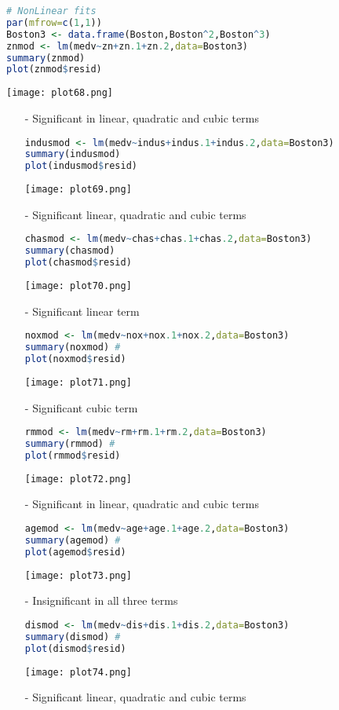 \documentclass[11pt]{report}
\begin{document}
\begin{lstlisting}[language=R]
# NonLinear fits
par(mfrow=c(1,1))
Boston3 <- data.frame(Boston,Boston^2,Boston^3)
znmod <- lm(medv~zn+zn.1+zn.2,data=Boston3)
summary(znmod)  
plot(znmod$resid)   
\end{lstlisting}
\texttt{[image: plot68.png]}
\begin{itemize}
\item[-] Significant in linear, quadratic and cubic terms

\begin{lstlisting}[language=R]
indusmod <- lm(medv~indus+indus.1+indus.2,data=Boston3)
summary(indusmod) 
plot(indusmod$resid)
\end{lstlisting}
\texttt{[image: plot69.png]}
\item[-] Significant linear, quadratic and cubic terms

\begin{lstlisting}[language=R]
chasmod <- lm(medv~chas+chas.1+chas.2,data=Boston3)
summary(chasmod) 
plot(chasmod$resid) 
\end{lstlisting}
\texttt{[image: plot70.png]}
\item[-] Significant linear term

\begin{lstlisting}[language=R]
noxmod <- lm(medv~nox+nox.1+nox.2,data=Boston3)
summary(noxmod) # 
plot(noxmod$resid)
\end{lstlisting}
\texttt{[image: plot71.png]}
\item[-] Significant cubic term

\begin{lstlisting}[language=R]
rmmod <- lm(medv~rm+rm.1+rm.2,data=Boston3)
summary(rmmod) # 
plot(rmmod$resid)
\end{lstlisting}
\texttt{[image: plot72.png]}
\item[-] Significant in linear, quadratic and cubic terms

\begin{lstlisting}[language=R]
agemod <- lm(medv~age+age.1+age.2,data=Boston3)
summary(agemod) # 
plot(agemod$resid)
\end{lstlisting}
\texttt{[image: plot73.png]}
\item[-] Insignificant in all three terms

\begin{lstlisting}[language=R]
dismod <- lm(medv~dis+dis.1+dis.2,data=Boston3)
summary(dismod) # 
plot(dismod$resid)
\end{lstlisting}
\texttt{[image: plot74.png]}
\item[-] Significant linear, quadratic and cubic terms


\end{itemize}
\end{document}
